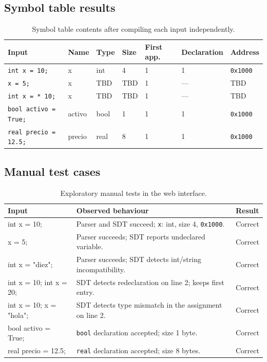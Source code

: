 \documentclass[11pt,a4paper]{article}
\begin{document}
\subsection{Symbol table results}
\begin{table}[H]
\centering
\small
\begin{tabular}{@{}lllllll@{}}
\toprule
\textbf{Input} & \textbf{Name} & \textbf{Type} & \textbf{Size} & \textbf{First app.} & \textbf{Declaration} & \textbf{Address}\\
\midrule
\texttt{int x = 10;} & x & int & 4 & 1 & 1 & \texttt{0x1000}\\
\texttt{x = 5;} & x & TBD & TBD & 1 & --- & TBD\\
\texttt{int x = * 10;} & x & TBD & TBD & 1 & --- & TBD\\
\texttt{bool activo = True;} & activo & bool & 1 & 1 & 1 & \texttt{0x1000}\\
\texttt{real precio = 12.5;} & precio & real & 8 & 1 & 1 & \texttt{0x1000}\\
\bottomrule
\end{tabular}
\caption{Symbol table contents after compiling each input independently.}
\end{table}

\subsection{Manual test cases}
\begin{table}[H]
\centering
\small
\begin{tabularx}{\textwidth}{@{}>{\ttfamily}lXl@{}}
\toprule
\textbf{Input} & \textbf{Observed behaviour} & \textbf{Result}\\
\midrule
int x = 10; & Parser and SDT succeed; \texttt{x}: int, size 4, \texttt{0x1000}. & Correct\\
x = 5; & Parser succeeds; SDT reports undeclared variable. & Correct\\
int x = "diez"; & Parser succeeds; SDT detects int/string incompatibility. & Correct\\
int x = 10; int x = 20; & SDT detects redeclaration on line 2; keeps first entry. & Correct\\
int x = 10; x = "hola"; & SDT detects type mismatch in the assignment on line 2. & Correct\\
bool activo = True; & \texttt{bool} declaration accepted; size 1 byte. & Correct\\
real precio = 12.5; & \texttt{real} declaration accepted; size 8 bytes. & Correct\\
\bottomrule
\end{tabularx}
\caption{Exploratory manual tests in the web interface.}
\end{table}
\end{document}
